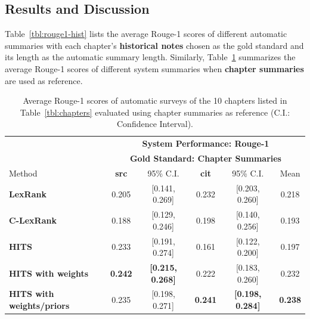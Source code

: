 \subsection{Results and Discussion}
Table~\ref{tbl:rouge1-hist} lists the average Rouge-1 scores of different automatic summaries with each chapter's {\bf historical notes} chosen as the gold standard and its length as the automatic summary length. Similarly, Table~\ref{tbl:rouge1-summ} summarizes the average Rouge-1 scores of different system summaries when {\bf chapter summaries} are used as reference.

\begin{table}[ht!]
\centering
{\small
\begin{tabular}{l@{\hspace{2cm}}cc@{\hspace{1cm}}cc@{\hspace{1cm}}c} \hline
       & \multicolumn{5}{c}{{\bf System Performance: Rouge-1}}\\
       & \multicolumn{5}{c}{{\bf Gold Standard: Chapter Summaries}}\\ \hline
Method & {\bf  src} & 95\% C.I. & {\bf cit} & 95\% C.I. & Mean\\ \hline \hline
{\bf LexRank}                   & 0.205 & [0.141, 0.269]  &  0.232 & [0.203, 0.260]  & 0.218 \\
{\bf C-LexRank}                 & 0.188 & [0.129, 0.246]  &  0.198 & [0.140, 0.256]  & 0.193 \\
{\bf HITS}                      & 0.233 & [0.191, 0.274]  &  0.161 & [0.122, 0.200]  & 0.197 \\
{\bf HITS with weights}         & {\bf 0.242} & {\bf [0.215, 0.268]}  &  0.222 & [0.183, 0.260]  & 0.232 \\
{\bf HITS with weights/priors}  & 0.235 & [0.198, 0.271]  &  {\bf 0.241} & {\bf [0.198, 0.284]}  & {\bf 0.238} \\ \hline
\end{tabular}}
\caption{Average Rouge-1 scores of automatic surveys of the 10 chapters listed in Table~\ref{tbl:chapters} evaluated using chapter summaries as reference (C.I.: Confidence Interval).}\label{tbl:rouge1-summ}
\end{table}

